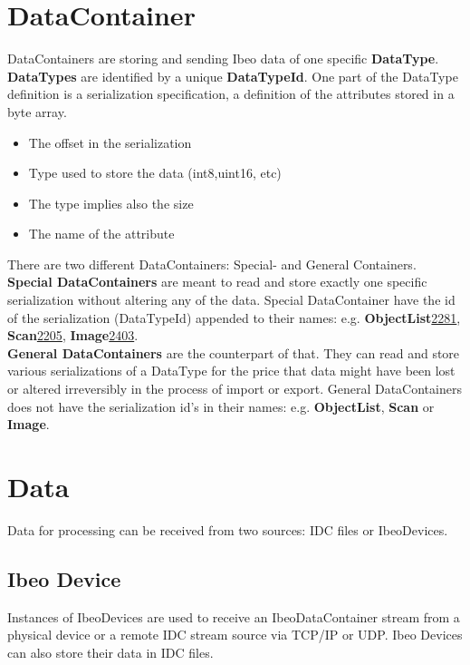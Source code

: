 \section{DataContainer}
DataContainers are storing and sending Ibeo data of one specific \textbf{DataType}. \textbf{DataTypes} are identified by a unique \textbf{DataTypeId}. One part of the DataType definition is a serialization specification, a definition of the attributes stored in a byte array.
\begin{itemize}
\item The offset in the serialization
\item Type used to store the data (int8,uint16, etc)
\item The type implies also the size
\item The name of the attribute
\end{itemize}
There are two different DataContainers: Special- and General Containers.\hfill \break
\\
\textbf{Special DataContainers} are meant to read and store exactly one specific serialization without altering any of the data. Special DataContainer have the
id of the serialization (DataTypeId) appended to their names: e.g. \textbf{ObjectList}\underline{2281}, \textbf{Scan}\underline{2205}, \textbf{Image}\underline{2403}.\hfill \break
\\
\textbf{General DataContainers} are the counterpart of that. They can read and store various serializations of a DataType for the price that data might have been lost or altered irreversibly in the process of import or export. General DataContainers does not have the serialization id's in their names: e.g. \textbf{ObjectList}, \textbf{Scan} or \textbf{Image}.

\newpage


\section{Data}
Data for processing can be received from two sources: IDC files or IbeoDevices.

\subsection{Ibeo Device}
Instances of IbeoDevices are used to receive an IbeoDataContainer stream from a physical device or a remote IDC stream source via TCP/IP or UDP. 
Ibeo Devices can also store their data in IDC files. 

